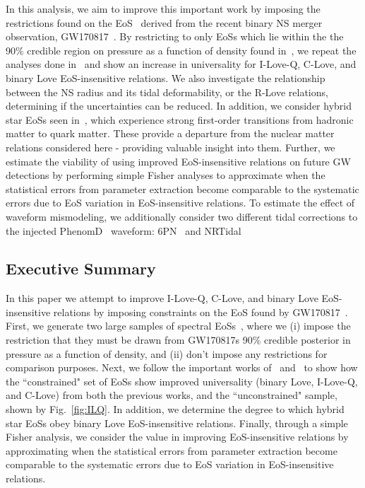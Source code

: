 \documentclass[prd,twocolumn,nofootinbib,superscriptaddress,amsmath,amssymb]{revtex4-1}
\begin{document}
In this analysis, we aim to improve this important work by imposing the restrictions found on the EoS~\cite{LIGO:posterior} derived from the recent binary NS merger observation, GW170817~\cite{TheLIGOScientific:2017qsa}.
By restricting to only EoSs which lie within the the 90\% credible region on pressure as a function of density found in~\cite{LIGO:posterior}, we repeat the analyses done in~\cite{Yagi:binLove,Yagi:ILQ} and show an increase in universality for I-Love-Q, C-Love, and binary Love EoS-insensitive relations.
We also investigate the relationship between the NS radius and its tidal deformability, or the R-Love relations, determining if the uncertainties can be reduced.
In addition, we consider hybrid star EoSs seen in~\cite{Paschalidis2018}, which experience strong first-order transitions from hadronic matter to quark matter.
These provide a departure from the nuclear matter relations considered here - providing valuable insight into them.
Further, we estimate the viability of using improved EoS-insensitive relations on future GW detections by performing simple Fisher analyses to approximate when the statistical errors from parameter extraction become comparable to the systematic errors due to EoS variation in EoS-insensitive relations.
To estimate the effect of waveform mismodeling, we additionally consider two different tidal corrections to the injected PhenomD~\cite{PhenomDI,PhenomDII} waveform: 6PN~\cite{Wade:tidalCorrections} and NRTidal~\cite{Samajdar:NRTidal}

\subsection{Executive Summary}

In this paper we attempt to improve I-Love-Q, C-Love, and binary Love EoS-insensitive relations by imposing constraints on the EoS found by GW170817~\cite{LIGO:posterior,TheLIGOScientific:2017qsa}.
First, we generate two large samples of spectral EoSs~\cite{Lindblom:2018rfr}, where we (i) impose the restriction that they must be drawn from GW170817s 90\% credible posterior in pressure as a function of density, and (ii) don't impose any restrictions for comparison purposes.
Next, we follow the important works of~\cite{Yagi:binLove} and~\cite{Yagi:ILQ} to show how the ``constrained" set of EoSs show improved universality (binary Love, I-Love-Q, and C-Love) from both the previous works, and the ``unconstrained" sample, shown by Fig.~\ref{fig:ILQ}.
In addition, we determine the degree to which hybrid star EoSs obey binary Love EoS-insensitive relations.
Finally, through a simple Fisher analysis, we consider the value in improving EoS-insensitive relations by approximating when the statistical errors from parameter extraction become comparable to the systematic errors due to EoS variation in EoS-insensitive relations.
\end{document}

